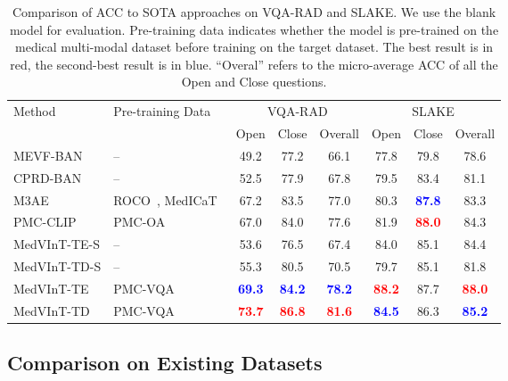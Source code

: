 \documentclass{article}
\begin{document}
\begin{table}[htb]
\centering
\footnotesize
\renewcommand{\arraystretch}{0.9}
\setlength{\tabcolsep}{6pt}
\caption{Comparison of ACC to SOTA approaches on VQA-RAD and SLAKE. 
We use the blank model for evaluation. 
Pre-training data indicates whether the model is pre-trained on the medical multi-modal dataset before training on the target dataset.
The best result is in red, the second-best result is in blue. ``Overal'' refers to the micro-average ACC of all the Open and Close questions.  
}
\vspace{3pt}
\begin{tabular}{ll|ccc|ccc}
\toprule
\multirow{2}{*}{Method} & \multirow{2}{*}{Pre-training Data\tnote{*}} & \multicolumn{3}{c|}{VQA-RAD} &  \multicolumn{3}{c}{SLAKE}  \\  
& & Open  & Close   & Overall & Open  & Close   & Overall \\ \midrule
 MEVF-BAN~\cite{nguyen2019overcoming} & -- &  49.2 & 77.2 & 66.1 & 77.8 & 79.8 & 78.6 \\
 CPRD-BAN~\cite{liu2021contrastive} & -- & 52.5 & 77.9 & 67.8 & 79.5 & 83.4 &  81.1 \\
 M3AE~\cite{chen2022multi} & ROCO~\cite{pelka2018roco}, MedICaT~\cite{subramanian-2020-medicat} &  67.2 & 83.5 & 77.0 & 80.3 & \textcolor{blue}{\bf 87.8} & 83.3 \\
 PMC-CLIP~\cite{lin2023pmcclip}  & PMC-OA~\cite{lin2023pmcclip} &  67.0 &  84.0 & 77.6 & 81.9 & \textcolor{red}{\bf 88.0} &  84.3 \\
 \midrule
MedVInT-TE-S & -- & 53.6 & 76.5 & 67.4 & 84.0 & 85.1 & 84.4 \\
MedVInT-TD-S & --  & 55.3 & 80.5 & 70.5 & 79.7 & 85.1 & 81.8 \\
MedVInT-TE & PMC-VQA & \textcolor{blue}{\bf 69.3} & \textcolor{blue}{\bf 84.2} & \textcolor{blue}{\bf 78.2} & \textcolor{red}{\bf 88.2} &  87.7 & \textcolor{red}{\bf 88.0} \\
 MedVInT-TD & PMC-VQA & \textcolor{red}{\bf 73.7} & \textcolor{red}{\bf 86.8} & \textcolor{red}{\bf 81.6}  &\textcolor{blue}{\bf 84.5} & 86.3 & \textcolor{blue}{\bf 85.2} \\
\bottomrule
\end{tabular}
\label{Tab:Transfer}
\end{table}

\subsection{Comparison on Existing Datasets}
\end{document}
